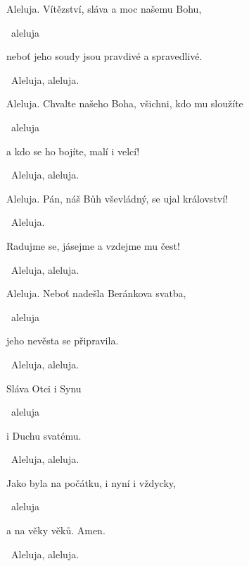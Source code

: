 \begin{psalmus}

Aleluja.
Vítězství, sláva a moc našemu Bohu, 

~aleluja

neboť jeho soudy jsou pravdivé a spravedlivé.
 
~Aleluja, aleluja.\vspace{2mm}

Aleluja. 
Chvalte našeho Boha, všichni, kdo mu sloužíte 

~aleluja

a kdo se ho bojíte, malí i velcí! 

~Aleluja, aleluja.\vspace{2mm}

Aleluja. 
Pán, náš Bůh vševládný, se ujal království! 

~Aleluja.

Radujme se, jásejme a vzdejme mu čest! 

~Aleluja, aleluja.\vspace{2mm}

Aleluja. 
Neboť nadešla Beránkova svatba, 

~aleluja

jeho nevěsta se připravila. 

~Aleluja, aleluja.\vspace{2mm}

Sláva Otci i Synu 

~aleluja

i Duchu svatému.

~Aleluja, aleluja.\vspace{2mm}

Jako byla na počátku, i nyní i vždycky, 

~aleluja

a na věky věků. Amen.

~Aleluja, aleluja. 
\end{psalmus}
